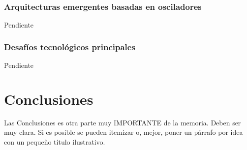 \documentclass[11pt,a4paper,spanish]{book}
\begin{document}
\subsection*{Arquitecturas emergentes basadas en osciladores}
Pendiente

\subsection*{Desafíos tecnológicos principales}
Pendiente


\chapter{Conclusiones}

Las Conclusiones es otra parte muy IMPORTANTE de la memoria. Deben ser muy clara. Si es posible se pueden itemizar o, mejor, poner un párrafo por idea con un pequeño título ilustrativo.
\end{document}

